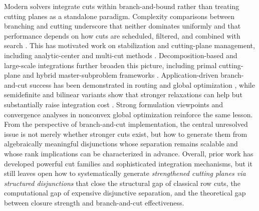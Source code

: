 \documentclass[11pt]{article}
\begin{document}
Modern solvers integrate cuts within branch-and-bound rather than treating cutting planes as a standalone paradigm. Complexity comparisons between branching and cutting underscore that neither dominates uniformly and that performance depends on how cuts are scheduled, filtered, and combined with search \citep{unknown2022complexity, D_r_2001}. This has motivated work on stabilization and cutting-plane management, including analytic-center and multi-cut methods \citep{Atkinson_1995, Kiwiel_1996, Nesterov_1995, Ye_1996, Elzinga_1975, Gondzio_1998}. Decomposition-based and large-scale integrations further broaden this picture, including primal cutting-plane and hybrid master-subproblem frameworks \citep{Rosat_2017, Young_1975, Sen_2005, unknown2020loose}. Application-driven branch-and-cut success has been demonstrated in routing and global optimization \citep{Baldacci_2007, Tawarmalani_2005}, while semidefinite and bilinear variants show that stronger relaxations can help but substantially raise integration cost \citep{Fischer_2005, Sherali_1980, Konno_1976, unknown2020outer, Nohra_2021}. Strong formulation viewpoints \citep{Wolsey_2003} and convergence analyses in nonconvex global optimization \citep{Tuy_1988, Sen_1985} reinforce the same lesson. From the perspective of branch-and-cut implementation, the central unresolved issue is not merely whether stronger cuts exist, but how to generate them from algebraically meaningful disjunctions whose separation remains scalable and whose rank implications can be characterized in advance. Overall, prior work has developed powerful cut families and sophisticated integration mechanisms, but it still leaves open how to systematically generate \emph{strengthened cutting planes via structured disjunctions} that close the structural gap of classical row cuts, the computational gap of expensive disjunctive separation, and the theoretical gap between closure strength and branch-and-cut effectiveness.



\end{document}
